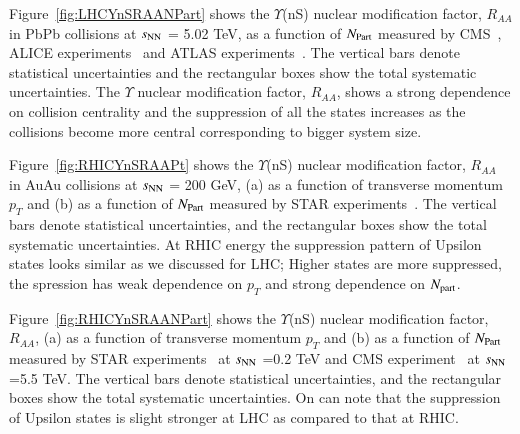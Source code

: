 Figure~\ref{fig:LHCYnSRAANPart} shows
the $\Upsilon$(nS) nuclear modification factor, $R_{AA}$
in PbPb collisions at $s_{\rm NN}$ = 5.02 TeV, as a function of $N_{\rm Part}$
measured by CMS~\cite{CMS:2018zza}, ALICE experiments~\cite{ALICE:2020wwx}
and ATLAS experiments~\cite{ALICE:2020wwx}.
 The vertical bars denote statistical uncertainties and the rectangular
boxes show the total systematic uncertainties. The $\Upsilon$ nuclear modification
factor, $R_{AA}$, shows a strong dependence on collision centrality and the
suppression of all the states increases as the collisions become more central
corresponding to bigger system size. 

    
Figure~\ref{fig:RHICYnSRAAPt} shows the $\Upsilon$(nS) nuclear modification factor, $R_{AA}$
in AuAu collisions at $s_{\rm NN}$ = 200 GeV,
 (a) as a function of transverse momentum $p_{T}$
and (b) as a function of $N_{\rm Part}$ measured by STAR
experiments~\cite{Wang:2019vau}. The vertical bars denote
statistical uncertainties, and the rectangular boxes show the total systematic
uncertainties. At RHIC energy the suppression pattern of Upsilon states
looks similar as we discussed for LHC; Higher states are more suppressed,
the spression has weak dependence on $p_T$ and strong dependence on $N_{\rm part}$.



Figure~\ref{fig:RHICYnSRAANPart} shows
  the $\Upsilon$(nS) nuclear modification factor, $R_{AA}$, (a) as a function of transverse momentum $p_{T}$
  and (b) as a function of $N_{\rm Part}$ measured by STAR experiments~\cite{Wang:2019vau} at $s_{\rm NN}$ =0.2 TeV and
  CMS experiment~\cite{CMS:2018zza} at $s_{\rm NN}$ =5.5 TeV.
The vertical bars denote statistical uncertainties, and the
rectangular boxes show the total systematic uncertainties.
On can note that the suppression of Upsilon states is slight stronger at
LHC as compared to that at RHIC.   


  


